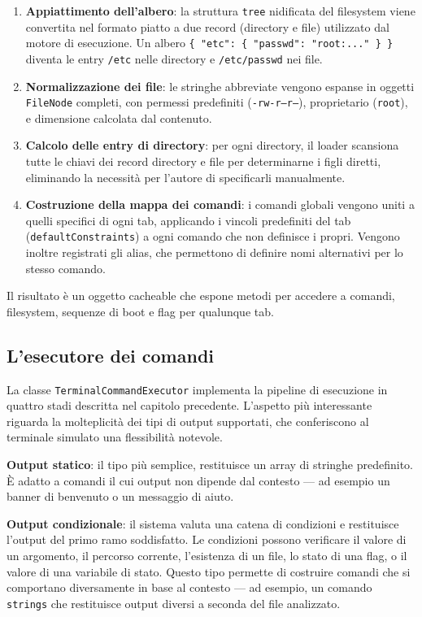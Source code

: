 \begin{enumerate}
    \item \textbf{Appiattimento dell'albero}: la struttura \texttt{tree} nidificata del filesystem viene convertita nel formato piatto a due record (directory e file) utilizzato dal motore di esecuzione. Un albero \texttt{\{ "etc": \{ "passwd": "root:..." \} \}} diventa le entry \texttt{/etc} nelle directory e \texttt{/etc/passwd} nei file.

    \item \textbf{Normalizzazione dei file}: le stringhe abbreviate vengono espanse in oggetti \texttt{FileNode} completi, con permessi predefiniti (\texttt{-rw-r--r--}), proprietario (\texttt{root}), e dimensione calcolata dal contenuto.

    \item \textbf{Calcolo delle entry di directory}: per ogni directory, il loader scansiona tutte le chiavi dei record directory e file per determinarne i figli diretti, eliminando la necessità per l'autore di specificarli manualmente.

    \item \textbf{Costruzione della mappa dei comandi}: i comandi globali vengono uniti a quelli specifici di ogni tab, applicando i vincoli predefiniti del tab (\texttt{defaultConstraints}) a ogni comando che non definisce i propri. Vengono inoltre registrati gli alias, che permettono di definire nomi alternativi per lo stesso comando.
\end{enumerate}

Il risultato è un oggetto cacheable che espone metodi per accedere a comandi, filesystem, sequenze di boot e flag per qualunque tab.

\subsection{L'esecutore dei comandi}

La classe \texttt{TerminalCommandExecutor} implementa la pipeline di esecuzione in quattro stadi descritta nel capitolo precedente. L'aspetto più interessante riguarda la molteplicità dei tipi di output supportati, che conferiscono al terminale simulato una flessibilità notevole.

\textbf{Output statico}: il tipo più semplice, restituisce un array di stringhe predefinito. È adatto a comandi il cui output non dipende dal contesto --- ad esempio un banner di benvenuto o un messaggio di aiuto.

\textbf{Output condizionale}: il sistema valuta una catena di condizioni e restituisce l'output del primo ramo soddisfatto. Le condizioni possono verificare il valore di un argomento, il percorso corrente, l'esistenza di un file, lo stato di una flag, o il valore di una variabile di stato. Questo tipo permette di costruire comandi che si comportano diversamente in base al contesto --- ad esempio, un comando \texttt{strings} che restituisce output diversi a seconda del file analizzato.

